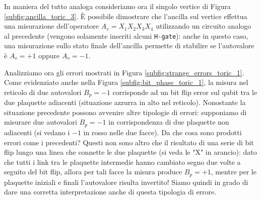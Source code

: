 \noindent In maniera del tutto analoga consideriamo ora il singolo vertice di Figura \ref{subfig:ancilla_toric_3}. È possibile dimostrare che l'ancilla sul vertice effettua una misurazione dell'operatore $A_v = X_1 X_2 X_3 X_4 $ utilizzando un circuito analogo al precedente (vengono solamente inseriti alcuni \texttt{H-gate}): anche in questo caso, una misurazione sullo stato finale dell'ancilla permette di stabilire se l'autovalore è $A_v = +1$ oppure $A_v = -1$. 

\noindent Analizziamo ora gli errori mostrati in Figura \ref{subfig:strange_errors_toric_1}. Come evidenziato anche nella Figura \ref{subfig:bit_phase_toric_1}, la misura nel reticolo di due autovalori $B_p = -1$ corrisponde ad un bit flip error sul qubit tra le due plaquette adiacenti (situazione azzurra in alto nel reticolo). Nonostante la situazione precedente possono avvenire altre tipologie di errori: supponiamo di misurare due autovalori $B_p = -1$ in corrispondenza di due plaquette non adiacenti (si vedano i $-1$ in rosso nelle due facce). Da che cosa sono prodotti errori come i precedenti? Questi non sono altro che il risultato di una serie di bit flip lungo una linea che connette le due plaquette (si veda le "X" in arancio): dato che tutti i link tra le plaquette intermedie hanno cambiato segno due volte a seguito del bit flip, allora per tali facce la misura produce $B_p = +1$, mentre per le plaquette iniziali e finali l'autovalore risulta invertito! Siamo quindi in grado di dare una corretta interpretazione anche di questa tipologia di errore. 

